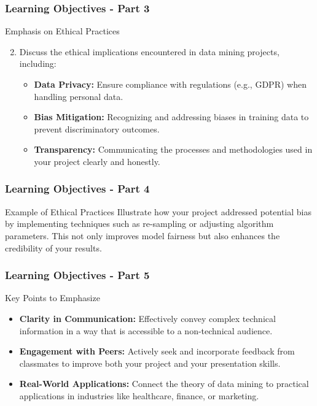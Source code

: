\documentclass[aspectratio=169]{beamer}
\begin{document}
\begin{frame}[fragile]
    \frametitle{Learning Objectives - Part 3}
    \begin{block}{Emphasis on Ethical Practices}
        \begin{enumerate}
            \setcounter{enumi}{1}
            \item Discuss the ethical implications encountered in data mining projects, including:
                \begin{itemize}
                    \item \textbf{Data Privacy:} Ensure compliance with regulations (e.g., GDPR) when handling personal data.
                    \item \textbf{Bias Mitigation:} Recognizing and addressing biases in training data to prevent discriminatory outcomes.
                    \item \textbf{Transparency:} Communicating the processes and methodologies used in your project clearly and honestly.
                \end{itemize}
        \end{enumerate}
    \end{block}
\end{frame}

\begin{frame}[fragile]
    \frametitle{Learning Objectives - Part 4}
    \begin{block}{Example of Ethical Practices}
        Illustrate how your project addressed potential bias by implementing techniques such as re-sampling or adjusting algorithm parameters. This not only improves model fairness but also enhances the credibility of your results.
    \end{block}
\end{frame}

\begin{frame}[fragile]
    \frametitle{Learning Objectives - Part 5}
    \begin{block}{Key Points to Emphasize}
        \begin{itemize}
            \item \textbf{Clarity in Communication:} Effectively convey complex technical information in a way that is accessible to a non-technical audience.
            \item \textbf{Engagement with Peers:} Actively seek and incorporate feedback from classmates to improve both your project and your presentation skills.
            \item \textbf{Real-World Applications:} Connect the theory of data mining to practical applications in industries like healthcare, finance, or marketing.
        \end{itemize}
    \end{block}
\end{frame}
\end{document}
